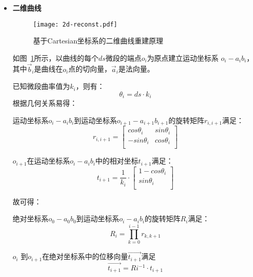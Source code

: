 \begin{itemize}

\item \textbf{二维曲线} \\

\FloatBarrier
\begin{figure}
\centering
\texttt{[image: 2d-reconst.pdf]}
\caption{基于Cartesian坐标系的二维曲线重建原理}
\label{fig:2d-reconst} 
\end{figure}
\FloatBarrier

如图~\ref{fig:2d-reconst}所示，以曲线的每个$ds$微段的端点$o_i$为原点建立运动坐标系 $o_i-a_ib_i$，
其中$\vec b_i$是曲线在$o_i$点的切向量，$\vec a_i$是法向量。

已知微段曲率值为$k_i$，则有：
\begin{equation}
\theta_i = ds\cdot k_i
\end{equation}
根据几何关系易得：

运动坐标系$o_i-a_ib_i$到运动坐标系$o_{i+1}-a_{i+1}b_{i+1}$的旋转矩阵$r_{i, i+1}$满足：
    \begin{equation}
    r_{i, i+1} = \left[
      \begin{matrix}
      cos \theta_i & sin \theta_i\\
      -sin \theta_i & cos \theta_i\\
      \end{matrix}
    \right]
    \end{equation}
    
$o_{i+1}$在运动坐标系$o_i-a_ib_i$中的相对坐标$t_{i+1}$满足：
    \begin{equation}
    t_{i+1} = \frac{1}{k_i} \cdot \left[
      \begin{matrix}
    	1 - cos\theta_i\\
      sin\theta_i\\
      \end{matrix}
    \right]
    \end{equation}
    

故可得：

绝对坐标系$o_0-a_0b_0$到运动坐标系$o_i-a_ib_i$的旋转矩阵$R_i$满足：
    \begin{equation}
    R_i = \prod_{k = 0}^{i-1} r_{k, k+1}
    \end{equation}

$o_i$ 到$o_{i+1}$在绝对坐标系中的位移向量$\vec{t_{i+1}}$满足
    \begin{equation}
    \vec{t_{i+1}} = Ri^{-1}\cdot t_{i+1}
    \end{equation}
    

\end{itemize}

